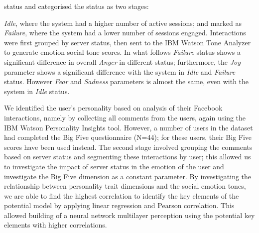 \documentclass[graybox]{svmult}
\begin{document}
status and categorised the status as two stages: {\emph{Idle}, where
the system had a higher number of active sessions; and marked as
{\emph{Failure}}, where the system had a lower number of sessions
engaged. Interactions were first grouped by server status, then sent
to the IBM Watson Tone Analyzer to generate emotion social tone
scores. In what follows {\emph{Failure}} status shows a significant
difference in overall {\emph{Anger}} in different status; furthermore,
the {\emph{Joy}} parameter shows a significant difference with the
system in {\emph{Idle}} and {\emph{Failure}} status. However
{\emph{Fear}} and {\emph{Sadness}} parameters is almost the same, even
with the system in {\emph{Idle}} status.







We identified the user's personality based on analysis of their
Facebook interactions, namely by collecting all comments from the
users, again using the IBM Watson Personality Insights tool. However,
a number of users in the dataset had completed the Big Five
questionnaire (N=44); for these users, their Big Five scores have
been used instead. The second stage involved grouping the comments
based on server status and segmenting these interactions by user; this
allowed us to investigate the impact of server status in the emotion
of the user and investigate the Big Five dimension as a constant
parameter. By investigating the relationship between personality trait
dimensions and the social emotion tones, we are able to find the
highest correlation to identify the key elements of the potential
model by applying linear regression and Pearson correlation. This
allowed building of a neural network multilayer perception using the
potential key elements with higher correlations.

}
\end{document}
